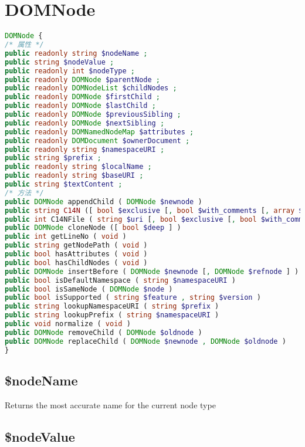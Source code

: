 \begin{lstlisting}[language=PHP]

\end{lstlisting}
\section{DOMNode}


\begin{lstlisting}[language=PHP]
DOMNode {
/* 属性 */
public readonly string $nodeName ;
public string $nodeValue ;
public readonly int $nodeType ;
public readonly DOMNode $parentNode ;
public readonly DOMNodeList $childNodes ;
public readonly DOMNode $firstChild ;
public readonly DOMNode $lastChild ;
public readonly DOMNode $previousSibling ;
public readonly DOMNode $nextSibling ;
public readonly DOMNamedNodeMap $attributes ;
public readonly DOMDocument $ownerDocument ;
public readonly string $namespaceURI ;
public string $prefix ;
public readonly string $localName ;
public readonly string $baseURI ;
public string $textContent ;
/* 方法 */
public DOMNode appendChild ( DOMNode $newnode )
public string C14N ([ bool $exclusive [, bool $with_comments [, array $xpath [, array $ns_prefixes ]]]] )
public int C14NFile ( string $uri [, bool $exclusive [, bool $with_comments [, array $xpath [, array $ns_prefixes ]]]] )
public DOMNode cloneNode ([ bool $deep ] )
public int getLineNo ( void )
public string getNodePath ( void )
public bool hasAttributes ( void )
public bool hasChildNodes ( void )
public DOMNode insertBefore ( DOMNode $newnode [, DOMNode $refnode ] )
public bool isDefaultNamespace ( string $namespaceURI )
public bool isSameNode ( DOMNode $node )
public bool isSupported ( string $feature , string $version )
public string lookupNamespaceURI ( string $prefix )
public string lookupPrefix ( string $namespaceURI )
public void normalize ( void )
public DOMNode removeChild ( DOMNode $oldnode )
public DOMNode replaceChild ( DOMNode $newnode , DOMNode $oldnode )
}
\end{lstlisting}

\subsection{\$nodeName}

Returns the most accurate name for the current node type

\subsection{\$nodeValue}

